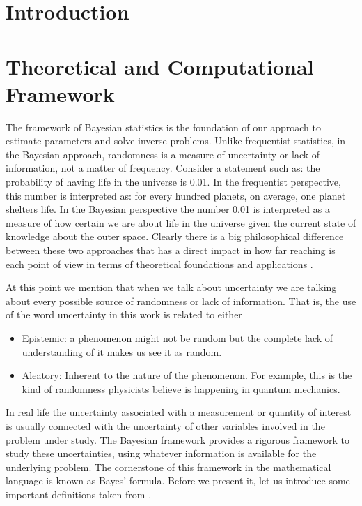\documentclass[12pt]{book}
\begin{document}
\chapter{Introduction}

\newpage

\chapter{Theoretical and Computational Framework}


The framework of Bayesian statistics is the foundation of  our approach to estimate parameters and solve 
inverse problems. Unlike frequentist statistics, in the Bayesian approach, randomness
is a measure of uncertainty or lack of information,  not a matter of frequency. Consider a statement such  as:
the probability of having life in the universe is 0.01. In the frequentist
perspective, this number is interpreted as: for every hundred planets, on average, one planet shelters life.
 In the Bayesian
perspective the number 0.01 is interpreted as a measure of how certain we are about life in the universe
given the current state of knowledge about the outer space. 
Clearly there is a big philosophical
difference between these two approaches that has a direct impact in how far reaching is each point of view 
in terms of theoretical foundations and applications  \cite{jaynes2003probability}.


At this point we mention that when we talk about uncertainty we are talking about every possible 
source of randomness  or  lack of information. That is, the use of the word uncertainty in this work
is related to either \cite{kennedy2001bayesian}
\begin{itemize}
\item Epistemic: a phenomenon might not be random but the complete lack of 
understanding of it makes us see it as random.
\item Aleatory: Inherent to the nature of the phenomenon. For 
example, this is the kind of randomness physicists believe is happening in quantum mechanics.
\end{itemize}
In real life the uncertainty associated with a  measurement or  quantity 
of interest is usually connected  with the uncertainty  of other variables involved in the problem under study. 
The Bayesian framework provides a rigorous framework to study these uncertainties, 
using whatever information is available for the underlying problem. The cornerstone of this framework
in the mathematical language is known as   Bayes' formula. Before we present it, let us 
introduce some important definitions taken from \cite{dudley2002real}.
\end{document}

